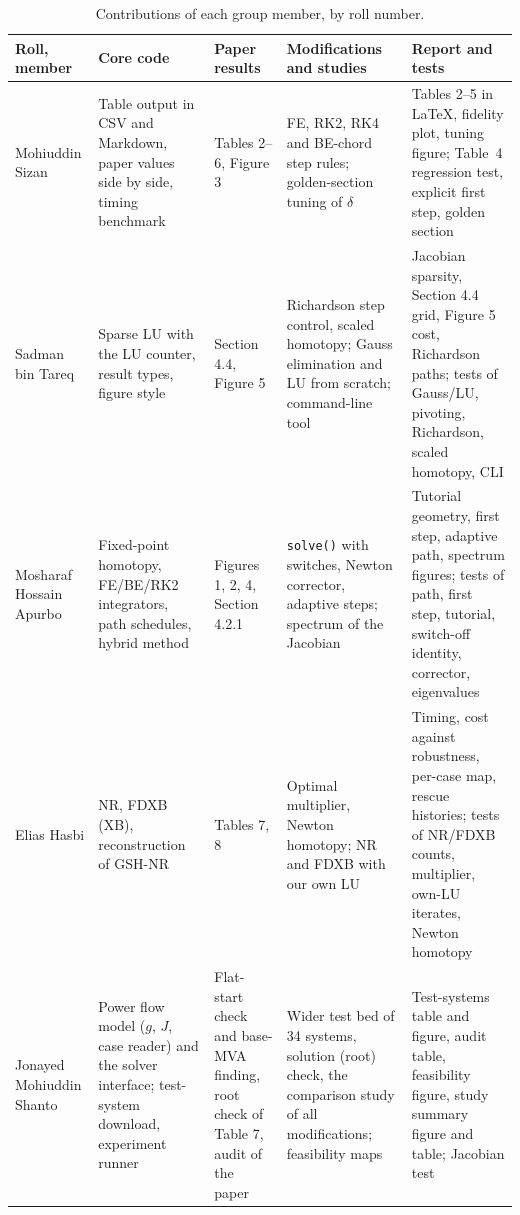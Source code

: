 \documentclass[sigconf,nonacm]{acmart}
\newcommand{\thead}[1]{\textbf{#1}}
\newcommand{\code}[1]{\texttt{#1}}
\begin{document}
\begin{table}[!htbp]
\centering
\caption{Contributions of each group member, by roll number.}
\label{tab:contrib}
\footnotesize
\begin{tabularx}{\textwidth}{@{}>{\raggedright\arraybackslash}p{2.6cm} >{\raggedright\arraybackslash}X >{\raggedright\arraybackslash}X >{\raggedright\arraybackslash}X >{\raggedright\arraybackslash}X@{}}
\toprule
\thead{Roll, member} & \thead{Core code} & \thead{Paper results} & \thead{Modifications and studies} & \thead{Report and tests} \\
\midrule
2105039\newline Mohiuddin Sizan & Table output in CSV and Markdown, paper values side by side, timing benchmark & Tables 2--6, Figure 3 & FE, RK2, RK4 and BE-chord step rules; golden-section tuning of $\delta$ & Tables 2--5 in \LaTeX, fidelity plot, tuning figure; Table~4 regression test, explicit first step, golden section \\
2105040\newline Sadman bin Tareq & Sparse LU with the LU counter, result types, figure style & Section 4.4, Figure 5 & Richardson step control, scaled homotopy; Gauss elimination and LU from scratch; command-line tool & Jacobian sparsity, Section 4.4 grid, Figure 5 cost, Richardson paths; tests of Gauss/LU, pivoting, Richardson, scaled homotopy, CLI \\
2105057\newline Mosharaf Hossain Apurbo & Fixed-point homotopy, FE/BE/RK2 integrators, path schedules, hybrid method & Figures 1, 2, 4, Section 4.2.1 & \code{solve()} with switches, Newton corrector, adaptive steps; spectrum of the Jacobian & Tutorial geometry, first step, adaptive path, spectrum figures; tests of path, first step, tutorial, switch-off identity, corrector, eigenvalues \\
2105058\newline Elias Hasbi & NR, FDXB (XB), reconstruction of GSH-NR & Tables 7, 8 & Optimal multiplier, Newton homotopy; NR and FDXB with our own LU & Timing, cost against robustness, per-case map, rescue histories; tests of NR/FDXB counts, multiplier, own-LU iterates, Newton homotopy \\
2105060\newline Jonayed Mohiuddin Shanto & Power flow model ($g$, $J$, case reader) and the solver interface; test-system download, experiment runner & Flat-start check and base-MVA finding, root check of Table 7, audit of the paper & Wider test bed of 34 systems, solution (root) check, the comparison study of all modifications; feasibility maps & Test-systems table and figure, audit table, feasibility figure, study summary figure and table; Jacobian test \\
\bottomrule
\end{tabularx}
\end{table}
\end{document}
